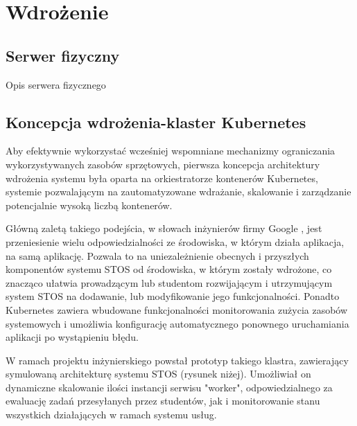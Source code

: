 \chapter{Wdrożenie}
\section{Serwer fizyczny}
Opis serwera fizycznego
\section{Koncepcja wdrożenia-klaster Kubernetes}
Aby efektywnie wykorzystać wcześniej wspomniane mechanizmy ograniczania wykorzystywanych zasobów sprzętowych, pierwsza koncepcja architektury wdrożenia systemu była oparta na orkiestratorze kontenerów Kubernetes, systemie pozwalającym na zautomatyzowane wdrażanie, skalowanie i zarządzanie potencjalnie wysoką liczbą kontenerów.

Główną zaletą takiego podejścia, w słowach inżynierów firmy Google \cite{googleKubernetes}, jest przeniesienie wielu odpowiedzialności ze środowiska, w którym działa aplikacja, na samą aplikację. Pozwala to na uniezależnienie obecnych i przyszłych komponentów systemu STOS od środowiska, w którym zostały wdrożone, co znacząco ułatwia prowadzącym lub studentom rozwijającym i utrzymującym system STOS na dodawanie, lub modyfikowanie jego funkcjonalności. Ponadto Kubernetes zawiera wbudowane funkcjonalności monitorowania zużycia zasobów systemowych i umożliwia konfigurację automatycznego ponownego uruchamiania aplikacji po wystąpieniu błędu.

W ramach projektu inżynierskiego powstał prototyp takiego klastra, zawierający symulowaną architekturę systemu STOS (rysunek niżej). Umożliwiał on dynamiczne skalowanie ilości instancji serwisu "worker", odpowiedzialnego za ewaluację zadań przesyłanych przez studentów, jak i monitorowanie stanu wszystkich działających w ramach systemu usług.


